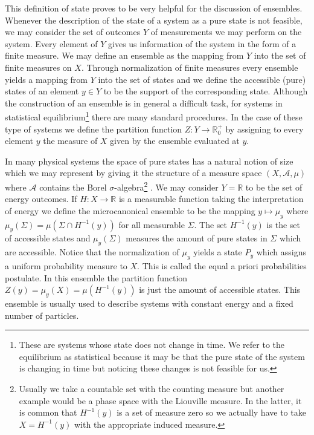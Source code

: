 This definition of state proves to be very helpful for the discussion of ensembles. Whenever the description of the state of a system as a pure state is not feasible, we may consider the set of outcomes $Y$ of measurements we may perform on the system. Every element of $Y$ gives us information of the system in the form of a finite measure. We may define an ensemble as the mapping from $Y$ into the set of finite measures on $X$. Through normalization of finite measures every ensemble yields a mapping from $Y$ into the set of states and we define the accessible (pure) states of an element $y\in Y$ to be the support of the corresponding state. Although the construction of an ensemble is in general a difficult task, for systems in statistical equilibrium\footnote{These are systems whose state does not change in time. We refer to the equilibrium as statistical because it may be that the pure state of the system is changing in time but noticing these changes is not feasible for us.} there are many standard procedures. In the case of these type of systems we define the partition function $Z:Y\to \mathbb{R}^+_0$ by assigning to every element $y$ the measure of $X$ given by the ensemble evaluated at $y$.

\begin{example}
In many physical systems the space of pure states has a natural notion of size which we may represent by giving it the structure of a measure space $(X,\mathcal{A},\mu)$ where $\mathcal{A}$ contains the Borel $\sigma$-algebra\footnote{Usually we take a countable set with the counting measure but another example would be a phase space with the Liouville measure. In the latter, it is common that $H^{-1}(y)$ is a set of measure zero so we actually have to take $X=H^{-1}(y)$ with the appropriate induced measure.} . We may consider $Y = \mathbb{R}$ to be the set of energy outcomes. If $H:X\rightarrow \mathbb{R}$ is a measurable function taking the interpretation of energy we define the microcanonical ensemble to be the mapping $y\mapsto \mu_y$ where $\mu_y(\Sigma) = \mu(\Sigma\cap H^{-1}(y))$ for all measurable $\Sigma$. The set $H^{-1}(y)$ is the set of accessible states and $\mu_y(\Sigma)$ measures the amount of pure states in $\Sigma$ which are accessible. Notice that the normalization of $\mu_y$ yields a state $P_y$ which assigns a uniform probability measure to $X$. This is called the equal a priori probabilities postulate. In this ensemble the partition function $Z(y) = \mu_y(X) = \mu(H^{-1}(y))$ is just the amount of accessible states. This ensemble is usually used to describe systems with constant energy and a fixed number of particles.
\end{example}


